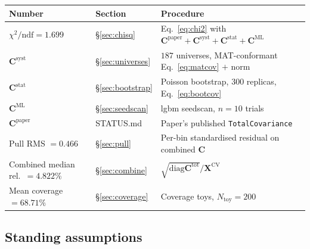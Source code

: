 \documentclass[12pt]{article}
\newcommand{\paper}{\text{paper}}
\newcommand{\CV}{\text{CV}}
\newcommand{\stat}{\text{stat}}
\newcommand{\syst}{\text{syst}}
\newcommand{\ML}{\text{ML}}
\newcommand{\tot}{\text{tot}}
\newcommand{\diag}{\mathrm{diag}}
\begin{document}
\begin{center}
\begin{tabular}{@{}lll@{}}
\toprule
Number & Section & Procedure \\
\midrule
$\chi^{2}/\mathrm{ndf} = 1.699$ & \S\ref{sec:chisq} &
  Eq.~\eqref{eq:chi2} with $\mathbf{C}^{\paper}+\mathbf{C}^{\syst}+\mathbf{C}^{\stat}+\mathbf{C}^{\ML}$ \\
$\mathbf{C}^{\syst}$ & \S\ref{sec:universes} &
  $187$ universes, MAT-conformant Eq.~\eqref{eq:matcov} $+$ norm \\
$\mathbf{C}^{\stat}$ & \S\ref{sec:bootstrap} &
  Poisson bootstrap, $300$ replicas, Eq.~\eqref{eq:bootcov} \\
$\mathbf{C}^{\ML}$ & \S\ref{sec:seedscan} & lgbm seedscan, $n=10$ trials \\
$\mathbf{C}^{\paper}$ & STATUS.md & Paper's published \texttt{TotalCovariance} \\
Pull RMS $= 0.466$ & \S\ref{sec:pull} &
  Per-bin standardised residual on combined $\mathbf{C}$ \\
Combined median rel.\ $= 4.822\%$ & \S\ref{sec:combine} &
  $\sqrt{\diag\mathbf{C}^{\tot}}/\mathbf{X}^{\CV}$ \\
Mean coverage $= 68.71\%$ & \S\ref{sec:coverage} &
  Coverage toys, $N_{\text{toy}}=200$ \\
\bottomrule
\end{tabular}
\end{center}

\subsection*{Standing assumptions}
\end{document}
